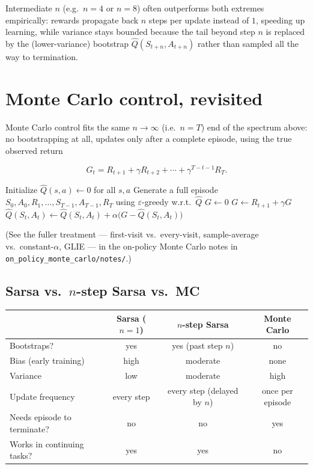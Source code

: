 \documentclass[11pt]{article}
\begin{document}
Intermediate $n$ (e.g.\ $n = 4$ or $n = 8$) often outperforms both
extremes empirically: rewards propagate back $n$ steps per update instead
of $1$, speeding up learning, while variance stays bounded because the
tail beyond step $n$ is replaced by the (lower-variance) bootstrap
$\hat{Q}(S_{t+n}, A_{t+n})$ rather than sampled all the way to termination.

\section{Monte Carlo control, revisited}
\label{sec:mc}

Monte Carlo control fits the same $n \to \infty$ (i.e.\ $n = T$) end of the
spectrum above: no bootstrapping at all, updates only after a complete
episode, using the true observed return

\[
    G_t = R_{t+1} + \gamma R_{t+2} + \cdots + \gamma^{T-t-1} R_T.
\]

\begin{algorithm}[h]
\caption{On-policy MC control (constant-$\alpha$, every-visit) — for comparison}
\begin{algorithmic}[1]
\State Initialize $\hat{Q}(s,a) \leftarrow 0$ for all $s,a$
    \State Generate a full episode $S_0, A_0, R_1, \dots, S_{T-1}, A_{T-1}, R_T$ using $\varepsilon$-greedy w.r.t.\ $\hat{Q}$
    \State $G \leftarrow 0$
        \State $G \leftarrow R_{t+1} + \gamma G$
        \State $\hat{Q}(S_t, A_t) \leftarrow \hat{Q}(S_t, A_t) + \alpha \big( G - \hat{Q}(S_t, A_t) \big)$
    \EndFor
\EndFor
\end{algorithmic}
\end{algorithm}

(See the fuller treatment — first-visit vs.\ every-visit, sample-average
vs.\ constant-$\alpha$, GLIE — in the on-policy Monte Carlo notes in
\texttt{on\_policy\_monte\_carlo/notes/}.)

\subsection{Sarsa vs.\ $n$-step Sarsa vs.\ MC}

\begin{center}
\begin{tabular}{@{}lccc@{}}
\toprule
 & Sarsa ($n{=}1$) & $n$-step Sarsa & Monte Carlo \\
\midrule
Bootstraps? & yes & yes (past step $n$) & no \\
Bias (early training) & high & moderate & none \\
Variance & low & moderate & high \\
Update frequency & every step & every step (delayed by $n$) & once per episode \\
Needs episode to terminate? & no & no & yes \\
Works in continuing tasks? & yes & yes & no \\
\bottomrule
\end{tabular}
\end{center}
\end{document}
